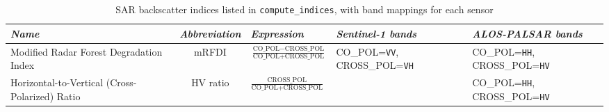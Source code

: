\documentclass[final-report]{report-template}
\begin{document}
\begin{table}[htbp]
    \centering
    \caption{SAR backscatter indices listed in \texttt{compute\_indices}, with band mappings for each sensor}
    \label{tab:sar-indices}
    \renewcommand{\arraystretch}{1.3}
    \begin{tabularx}{\textwidth}{L c >{\hsize}L >{\hsize}L >{\hsize}L}
        \toprule
        \textit{Name} & \textit{Abbreviation} & \textit{Expression} & \textit{Sentinel-1 bands} & \textit{ALOS-PALSAR bands} \\
        \midrule
        Modified Radar Forest Degradation Index  & mRFDI  & $\frac{\text{CO\_POL} - \text{CROSS\_POL}}{\text{CO\_POL} + \text{CROSS\_POL}}$ & {\scriptsize CO\_POL=\texttt{VV}, CROSS\_POL=\texttt{VH}} & {\scriptsize CO\_POL=\texttt{HH}, CROSS\_POL=\texttt{HV}} \\
        \addlinespace
        Horizontal-to-Vertical (Cross-Polarized) Ratio & HV ratio & $\frac{\text{CROSS\_POL}}{\text{CO\_POL} + \text{CROSS\_POL}}$ &  & {\scriptsize CO\_POL=\texttt{HH}, CROSS\_POL=\texttt{HV}} \\
        \bottomrule
    \end{tabularx}
\end{table}

\clearpage
\end{document}
